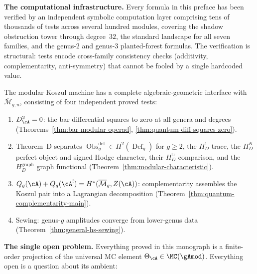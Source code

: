 \bigskip

\noindent\textbf{The computational infrastructure.}
Every formula in this preface has been verified by an independent symbolic
computation layer comprising tens of thousands of tests across several
hundred modules, covering the shadow obstruction tower through degree~$32$,
the standard landscape for all seven families, and the genus-$2$ and
genus-$3$ planted-forest formulas. The verification is structural: tests
encode cross-family consistency checks (additivity, complementarity,
anti-symmetry) that cannot be fooled by a single hardcoded value.

\begin{principle}
\label{princ:four-test-interface}
%
The modular Koszul machine has a complete algebraic-geometric
interface with $\overline{\mathcal M}_{g,n}$, consisting of
four independent proved tests:
\begin{enumerate}[label=\textup{(\roman*)},nosep]
\item $D_\cA^2 = 0$:
 the bar differential squares to zero at all genera and degrees
 \textup{(}Theorems~\textup{\ref{thm:bar-modular-operad},
 \ref{thm:quantum-diff-squares-zero}}\textup{)}.
\item Theorem~D separates
 $\operatorname{Obs}^{\mathrm{def}}_g\in H^2(\operatorname{Def}_g)$
 for $g\geq2$,
 the $H_D^1$ trace, the $H_D^K$ perfect object and signed Hodge
 character, their $H_D^{\mathrm{tr}}$ comparison, and the
 $H_D^{\mathrm{graph}}$ graph functional
 \textup{(}Theorem~\textup{\ref{thm:modular-characteristic}}\textup{)}.
\item $Q_g(\cA)+Q_g(\cA^!)=H^*(\overline{\mathcal M}_g,Z(\cA))$:
 complementarity assembles the Koszul pair into a Lagrangian
 decomposition
 \textup{(}Theorem~\textup{\ref{thm:quantum-complementarity-main}}\textup{)}.
\item Sewing:
 genus-$g$ amplitudes converge from lower-genus data
 \textup{(}Theorem~\textup{\ref{thm:general-hs-sewing}}\textup{)}.
\end{enumerate}
\end{principle}

\bigskip

\noindent\textbf{The single open problem.}
Everything proved in this monograph is a finite-order projection
of the universal MC element
$\Theta_\cA \in \MC(\gAmod)$.
Everything open is a question about its ambient:

\begin{center}
\end{center}

